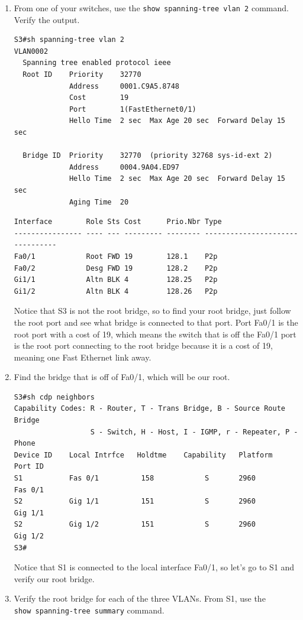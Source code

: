 \documentclass[b5paper,11pt]{memoir}
\begin{document}
\begin{enumerate}
\item
  From one of your switches, use the
  \texttt{show\ spanning-tree\ vlan\ 2} command. Verify the output.

\begin{verbatim}
S3#sh spanning-tree vlan 2
VLAN0002
  Spanning tree enabled protocol ieee
  Root ID    Priority    32770
             Address     0001.C9A5.8748
             Cost        19
             Port        1(FastEthernet0/1)
             Hello Time  2 sec  Max Age 20 sec  Forward Delay 15 sec
 
  Bridge ID  Priority    32770  (priority 32768 sys-id-ext 2)
             Address     0004.9A04.ED97
             Hello Time  2 sec  Max Age 20 sec  Forward Delay 15 sec
             Aging Time  20
\end{verbatim}

\begin{verbatim}
Interface        Role Sts Cost      Prio.Nbr Type
---------------- ---- --- --------- -------- --------------------------------
Fa0/1            Root FWD 19        128.1    P2p
Fa0/2            Desg FWD 19        128.2    P2p
Gi1/1            Altn BLK 4         128.25   P2p
Gi1/2            Altn BLK 4         128.26   P2p
\end{verbatim}

  Notice that S3 is not the root bridge, so to find your root bridge,
  just follow the root port and see what bridge is connected to that
  port. Port Fa0/1 is the root port with a cost of 19, which means the
  switch that is off the Fa0/1 port is the root port connecting to the
  root bridge because it is a cost of 19, meaning one Fast Ethernet link
  away.
\item
  Find the bridge that is off of Fa0/1, which will be our root.

\begin{verbatim}
S3#sh cdp neighbors
Capability Codes: R - Router, T - Trans Bridge, B - Source Route Bridge
                  S - Switch, H - Host, I - IGMP, r - Repeater, P - Phone
Device ID    Local Intrfce   Holdtme    Capability   Platform    Port ID
S1           Fas 0/1          158            S       2960        Fas 0/1
S2           Gig 1/1          151            S       2960        Gig 1/1
S2           Gig 1/2          151            S       2960        Gig 1/2
S3#
\end{verbatim}

  Notice that S1 is connected to the local interface Fa0/1, so let's go
  to S1 and verify our root bridge.
\item
  Verify the root bridge for each of the three VLANs. From S1, use the
  \texttt{show\ spanning-tree\ summary} command.


\end{enumerate}
\end{document}
